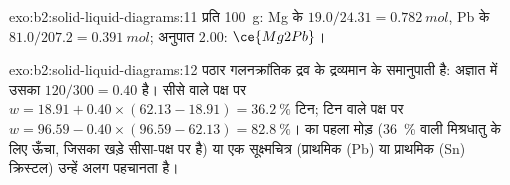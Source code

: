 \begin{solution}{exo:b2:solid-liquid-diagrams:11}
प्रति \qty{100}{g}: Mg के $19.0/24.31 = \qty{0.782}{mol}$, Pb के $81.0/207.2 =
\qty{0.391}{mol}$; अनुपात $2.00$: $\ce{Mg2Pb}$।
\end{solution}

\begin{solution}{exo:b2:solid-liquid-diagrams:12}
पठार गलनक्रांतिक द्रव के द्रव्यमान के समानुपाती है: अज्ञात में उसका
$120/300 = 0.40$ है। सीसे वाले पक्ष पर $w = 18.91 + 0.40 \times (62.13 -
18.91) = 36.2~\%$ टिन; टिन वाले पक्ष पर $w = 96.59 - 0.40 \times (96.59 - 62.13) =
82.8~\%$।  का पहला मोड़ (36~\% वाली मिश्रधातु के लिए ऊँचा,
जिसका  खड़े सीसा-पक्ष पर है) या एक सूक्ष्मचित्र (प्राथमिक (Pb) या
प्राथमिक (Sn) क्रिस्टल) उन्हें अलग पहचानता है।
\end{solution}

